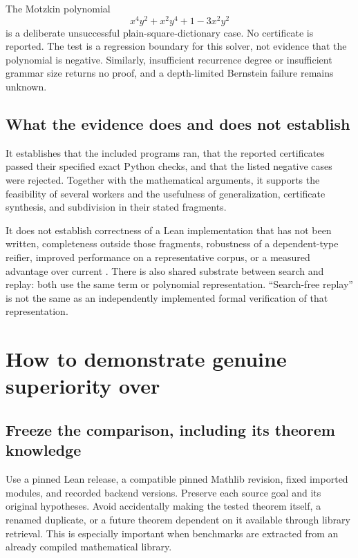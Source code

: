 The Motzkin polynomial
\[
x^4y^2+x^2y^4+1-3x^2y^2
\]
is a deliberate unsuccessful plain-square-dictionary case. No certificate is
reported. The test is a regression boundary for this solver, not evidence
that the polynomial is negative. Similarly, insufficient recurrence degree
or insufficient grammar size returns no proof, and a depth-limited Bernstein
failure remains unknown.

\subsection{What the evidence does and does not establish}

It establishes that the included programs ran, that the reported certificates
passed their specified exact Python checks, and that the listed negative
cases were rejected. Together with the mathematical arguments, it supports
the feasibility of several workers and the usefulness of generalization,
certificate synthesis, and subdivision in their stated fragments.

It does not establish correctness of a Lean implementation that has not been
written, completeness outside those fragments, robustness of a dependent-type
reifier, improved performance on a representative corpus, or a measured
advantage over current \Grind{}. There is also shared substrate between
search and replay: both use the same term or polynomial representation.
``Search-free replay'' is not the same as an independently implemented formal
verification of that representation.

\section{How to demonstrate genuine superiority over \Grind{}}

\subsection{Freeze the comparison, including its theorem knowledge}

Use a pinned Lean release, a compatible pinned Mathlib revision, fixed imported
modules, and recorded backend versions. Preserve each source goal and its
original hypotheses. Avoid accidentally making the tested theorem itself,
a renamed duplicate, or a future theorem dependent on it available through
library retrieval. This is especially important when benchmarks are extracted
from an already compiled mathematical library.

